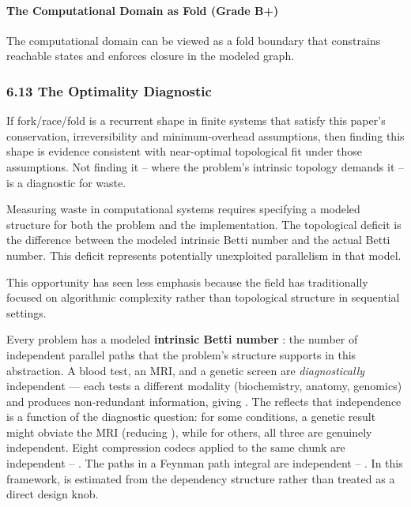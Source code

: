 \documentclass[
]{article}
\begin{document}
\paragraph{\texorpdfstring{\textbf{The Computational Domain as Fold
(Grade
B+)}}{The Computational Domain as Fold (Grade B+)}}\label{the-computational-domain-as-fold-grade-b}

The computational domain can be viewed as a fold boundary that
constrains reachable states and enforces closure in the modeled graph.

\subsubsection{\texorpdfstring{\textbf{6.13 The Optimality
Diagnostic}}{6.13 The Optimality Diagnostic}}\label{the-optimality-diagnostic}

If fork/race/fold is a recurrent shape in finite systems that satisfy
this paper's conservation, irreversibility and minimum-overhead
assumptions, then finding this shape is evidence consistent with
near-optimal topological fit under those assumptions. Not finding it --
where the problem's intrinsic topology demands it -- is a diagnostic for
waste.

Measuring waste in computational systems requires specifying a modeled
structure for both the problem and the implementation. The topological
deficit is the difference between the modeled intrinsic Betti number and
the actual Betti number. This deficit represents potentially unexploited
parallelism in that model.

This opportunity has seen less emphasis because the field has
traditionally focused on algorithmic complexity rather than topological
structure in sequential settings.

Every problem has a modeled \textbf{intrinsic Betti number} : the number
of independent parallel paths that the problem's structure supports in
this abstraction. A blood test, an MRI, and a genetic screen are
\emph{diagnostically} independent --- each tests a different modality
(biochemistry, anatomy, genomics) and produces non-redundant
information, giving . The reflects that independence is a function of
the diagnostic question: for some conditions, a genetic result might
obviate the MRI (reducing ), while for others, all three are genuinely
independent. Eight compression codecs applied to the same chunk are
independent -- . The paths in a Feynman path integral are independent --
. In this framework, is estimated from the dependency structure rather
than treated as a direct design knob.
\end{document}
